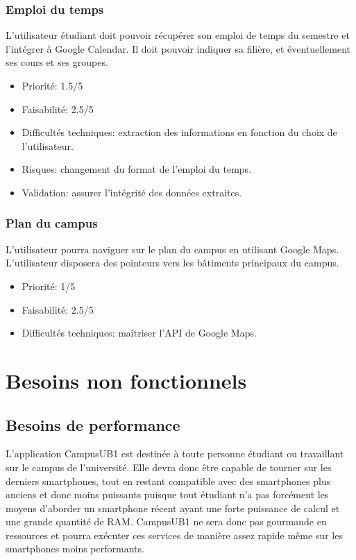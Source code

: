 \documentclass [pdftex,12pt] {report}
\begin{document}
\subsubsection{Emploi du temps}
L'utilisateur étudiant doit pouvoir récupérer son emploi de temps du semestre et l'intégrer à Google Calendar. Il doit pouvoir indiquer sa filière, et éventuellement ses cours et ses groupes. \\

\begin{itemize}
\renewcommand{\labelitemi}{$\bullet$}
\item Priorité: 1.5/5
\item Faisabilité: 2.5/5
\item Difficultés techniques: extraction des informations en fonction du choix de l'utilisateur.
\item Risques: changement du format de l'emploi du temps.
\item Validation: assurer l'intégrité des données extraites.
\end{itemize}

\subsubsection{Plan du campus}
L'utilisateur pourra naviguer sur le plan du campus en utilisant Google Maps. L'utilisateur disposera des pointeurs vers les bâtiments principaux du campus. \\

\begin{itemize}
\renewcommand{\labelitemi}{$\bullet$}
\item Priorité: 1/5
\item Faisabilité: 2.5/5
\item Difficultés techniques: maîtriser l'API de Google Maps.
\end{itemize}



\section{Besoins non fonctionnels}
\subsection{Besoins de performance}
L'application CampusUB1 est destinée à toute personne étudiant ou travaillant sur le campus de l'université. Elle devra donc être capable de tourner sur les derniers smartphones, tout en restant compatible avec des smartphones plus anciens et donc moins puissants puisque tout étudiant n'a pas forcément les moyens d'aborder un smartphone récent ayant une forte puissance de calcul et une grande quantité de RAM. CampusUB1 ne sera donc pas gourmande en ressources et pourra exécuter ces services de manière assez rapide même sur les smartphones moins performants. \\
\end{document}
